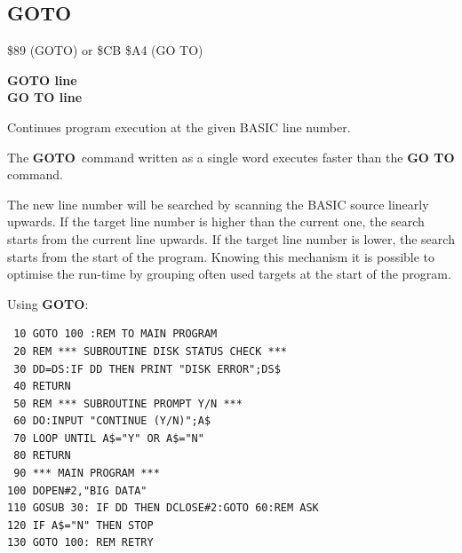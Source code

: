 
\newpage
\subsection{GOTO}
\begin{description}[leftmargin=2cm,style=nextline]
\item [Token:] \$89 (GOTO) or \$CB \$A4 (GO TO)
\item [Format:] {\bf GOTO line} \\
                {\bf GO TO line}
\item [Usage:] Continues program
               execution at the given BASIC line number.

               The {\bf GOTO} command written as a single
               word executes faster than the {\bf GO TO} command.

\item [Remarks:] The new line number will be searched by scanning
               the BASIC source linearly upwards. If the target
               line number is higher than the current one, the
               search starts from the current line upwards.
               If the target line number is lower, the search starts
               from the start of the program.
               Knowing this mechanism it is possible to optimise
               the run-time by grouping often used targets at the
               start of the program.

\item [Example:] Using {\bf GOTO}:
\begin{tcolorbox}[colback=black,coltext=white]
\verbatimfont{\codefont}
\begin{verbatim}
 10 GOTO 100 :REM TO MAIN PROGRAM
 20 REM *** SUBROUTINE DISK STATUS CHECK ***
 30 DD=DS:IF DD THEN PRINT "DISK ERROR";DS$
 40 RETURN
 50 REM *** SUBROUTINE PROMPT Y/N ***
 60 DO:INPUT "CONTINUE (Y/N)";A$
 70 LOOP UNTIL A$="Y" OR A$="N"
 80 RETURN
 90 *** MAIN PROGRAM ***
100 DOPEN#2,"BIG DATA"
110 GOSUB 30: IF DD THEN DCLOSE#2:GOTO 60:REM ASK
120 IF A$="N" THEN STOP
130 GOTO 100: REM RETRY
\end{verbatim}
\end{tcolorbox}
\end{description}


\newpage

